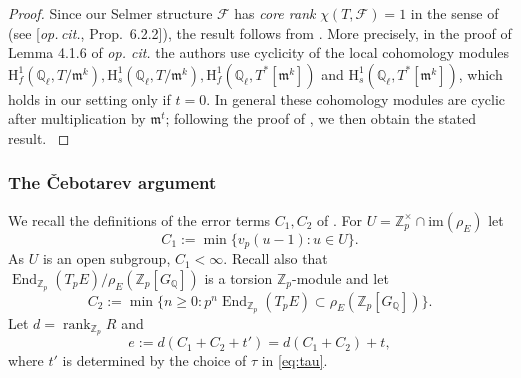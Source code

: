 \documentclass[10pt,reqno]{amsart}
\numberwithin{equation}{section}
\theoremstyle{plain}
\theoremstyle{definition}
\theoremstyle{definition}
\theoremstyle{plain}
\theoremstyle{plain}
\theoremstyle{plain}
\theoremstyle{plain}
\theoremstyle{plain}
\theoremstyle{plain}
\DeclareMathOperator{\ord}{ord}
\newcommand\SmallMatrix[1]{{%
  \tiny\arraycolsep=0.3\arraycolsep\ensuremath{\begin{pmatrix}#1\end{pmatrix}}}}
\newcommand{\Z}{\mathbb{Z}}
\newcommand{\Q}{\mathbb{Q}}
\DeclareMathOperator{\End}{End}
\newcommand{\Fcal}{\mathcal{F}}
\newcommand{\rank}{\mathrm{rank}}
\newcommand{\fm}{\mathfrak{m}}
\newcommand{\rH}{\mathrm{H}}
\begin{document}
\begin{proof}
Since our Selmer structure $\Fcal$ has \emph{core rank} $\chi(T,\Fcal)=1$ in the sense of \cite{mazrub} (see [\emph{op.\,cit.}, Prop.~6.2.2]), the result follows from \cite[Thm.~4.1.13]{mazrub}. {
More precisely, in the proof of Lemma 4.1.6 of {\it op. cit.} the authors use cyclicity of the local cohomology modules  $\rH^1_f(\Q_{\ell},T/\fm^k),\rH^1_s(\Q_{\ell},T/\fm^k),\rH^1_f(\Q_{\ell},T^*[\fm^k])$ and $\rH^1_s(\Q_{\ell},T^*[\fm^k])$, which 
holds in our setting only if $t=0$. In general these cohomology modules are cyclic after multiplication by $\fm^t$; following the proof of \cite{mazrub}, we then obtain the stated  result. 
}
\end{proof}
%



\subsubsection{The \v{C}ebotarev argument}\label{seccheb}
We recall the definitions of the error terms $C_1,C_2$ of \cite[$\S$3.3.1]{eisenstein}. For $U = \Z_p^\times\cap \mathrm{im}(\rho_E)$ let
\[
C_1 := \min\{v_p(u-1)\colon u\in U\}.
\]
As $U$ is an open subgroup, $C_1<\infty$.
Recall also that $\End_{\Z_p}(T_pE)/\rho_E(\Z_p[G_{\Q}])$ is a torsion $\Z_p$-module and let
\[
C_2:=\min\bigl\{ n\geq 0 \colon p^n\End_{\Z_p}(T_pE)\subset\rho_E(\Z_p[G_{\Q}])\bigr\}.
\]
Let $d=\operatorname{rank}_{\Z_p}R$ and 
\[
e:=d(C_1+C_2+t')=d(C_1+C_2)+t,
\]
where $t'$ is determined by the choice of $\tau$ in \eqref{eq:tau}.
\end{document}
